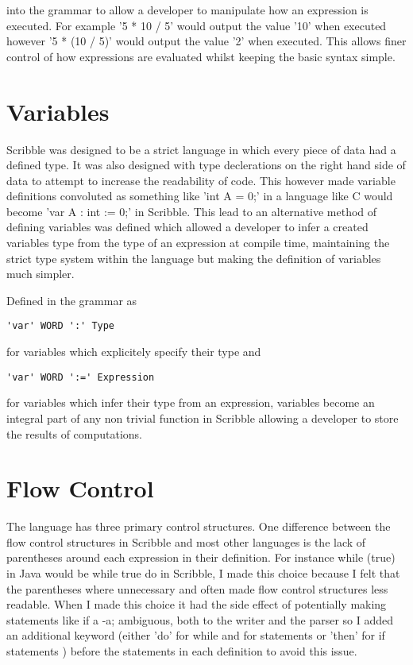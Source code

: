 \documentclass[]{final_report}
\begin{document}
into the grammar to allow a developer to manipulate how an expression is executed. For example '5 * 10 / 5' would output the value '10' when executed however '5 * (10 / 5)' would output the value '2' when executed. This allows finer control of how expressions are evaluated whilst keeping the basic syntax simple.

\section{Variables}

Scribble was designed to be a strict language in which every piece of data had a defined type. It was also designed with type declerations on the right hand side of data to attempt to increase the readability of code. This however made variable definitions convoluted as something like 'int A = 0;' in a language like C would become 'var A : int := 0;' in Scribble. This lead to an alternative method of defining variables was defined which allowed a developer to infer a created variables type from the type of an expression at compile time, maintaining the strict type system within the language but making the definition of variables much simpler.

Defined in the grammar as

\begin{verbatim}
'var' WORD ':' Type 
\end{verbatim}

for variables which explicitely specify their type and

\begin{verbatim}
'var' WORD ':=' Expression
\end{verbatim}

for variables which infer their type from an expression, variables become an integral part of any non trivial function in Scribble allowing a developer to store the results of computations.

\section{Flow Control}

The language has three primary control structures. One difference between the flow control structures in Scribble and most other languages is the lack of parentheses around each expression in their definition. For instance while (true) { } in Java would be while true do { } in Scribble, I made this choice because I felt that the parentheses where unnecessary and often made flow control structures less readable. When I made this choice it had the side effect of potentially making statements like if a -a; ambiguous, both to the writer and the parser so I added an additional keyword (either 'do' for while and for statements or 'then' for if statements ) before the statements in each definition to avoid this issue.
\end{document}
